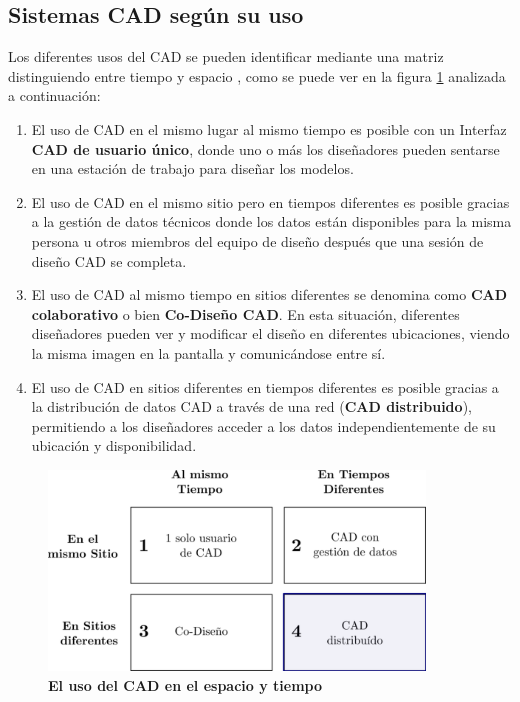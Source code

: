 \subsection{Sistemas CAD según su uso}
Los diferentes usos del CAD se pueden identificar mediante una matriz distinguiendo entre tiempo y espacio \citep{Maher1997}, como se puede ver en la figura \ref{fig:tablacad} analizada a continuación:

\begin{enumerate}
\item El uso de CAD en el mismo lugar al mismo tiempo es posible con un Interfaz \textbf{CAD de usuario único}, donde uno o más los diseñadores pueden sentarse en una estación de trabajo para diseñar los modelos.
\item El uso de CAD en el mismo sitio pero en tiempos diferentes es posible gracias a la gestión de datos técnicos donde los datos están disponibles para la misma persona u otros miembros del equipo de diseño después que una sesión de diseño CAD se completa.
\item El uso de CAD al mismo tiempo en sitios diferentes se denomina como
\textbf{CAD colaborativo} o bien \textbf{Co-Diseño CAD}. En esta situación, diferentes diseñadores pueden ver y modificar el diseño en diferentes ubicaciones, viendo la misma imagen en la pantalla y comunicándose entre sí.
\item El uso de CAD en sitios diferentes en tiempos diferentes es posible gracias a la distribución de datos CAD a través de una red (\textbf{CAD distribuido}), permitiendo a los diseñadores acceder a los datos independientemente de su ubicación y disponibilidad.
\end{enumerate}


\begin{figure}[h]
\includegraphics[width=10cm]{Img/CPD/cad-time.png}
\centering
\caption{\textbf{\footnotesize{El uso del CAD en el espacio y tiempo}}}
\label{fig:tablacad}
\end{figure}

